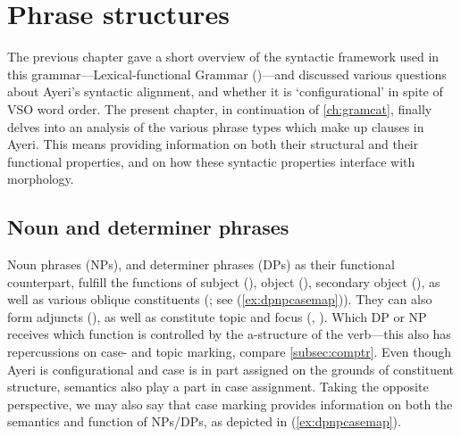 
\chapter{Phrase structures}
\label{ch:phrasestruct}

The previous chapter gave a short overview of the syntactic framework used in
this grammar---Lexical-functional Grammar (\Lfg{})---and discussed various
questions about Ayeri's syntactic alignment, and whether it is
`configurational' in spite of VSO word order. The present chapter, in
continuation of \autoref{ch:gramcat}, finally delves into an analysis of the
various phrase types which make up clauses in Ayeri. This means providing
information on both their structural and their functional properties, and on
how these syntactic properties interface with morphology.

\section{Noun and determiner phrases}
\label{sec:nps-dps}

Noun phrases (NPs), and determiner phrases (DPs) as their functional
counterpart, fulfill the functions of subject (\Subj{}), object (\Obj{}),
secondary object (\SObj{}), as well as various oblique constituents (\Oblique;
see (\ref{ex:dpnpcasemap})). They can also form adjuncts (\Adjc{}), as well as
constitute topic and focus (\Top{}, \Foc{}). Which DP or NP receives which
function is controlled by the a-structure of the verb---this also has
repercussions on case- and topic marking, compare \autoref{subsec:comptr}. Even
though Ayeri is configurational and case is in part
assigned on the grounds of constituent structure, semantics also play a part in
case assignment. Taking the opposite perspective, we may also say that case
marking provides information on both the semantics and function of NPs/DPs, as
depicted in (\ref{ex:dpnpcasemap}).

